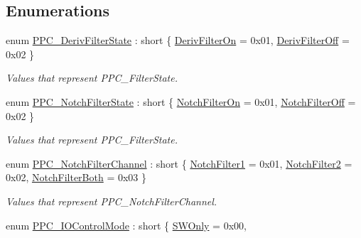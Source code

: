 \subsection*{Enumerations}
\begin{DoxyCompactItemize}
\item 
enum \hyperlink{group___benchtop_precision_piezo_ga59c677623dc0d8e960f123455ba8c864}{P\+P\+C\+\_\+\+Deriv\+Filter\+State} \+: short \{ \hyperlink{group___benchtop_precision_piezo_gga59c677623dc0d8e960f123455ba8c864ac42a693ab637e877321469b16739886a}{Deriv\+Filter\+On} = 0x01, 
\hyperlink{group___benchtop_precision_piezo_gga59c677623dc0d8e960f123455ba8c864af91f79528c0467fddbec264caeb9fc90}{Deriv\+Filter\+Off} = 0x02
 \}\begin{DoxyCompactList}\small\item\em Values that represent P\+P\+C\+\_\+\+Filter\+State. \end{DoxyCompactList}
\item 
enum \hyperlink{group___benchtop_precision_piezo_ga03b89881d4e9a76087bbe1d517dd62b0}{P\+P\+C\+\_\+\+Notch\+Filter\+State} \+: short \{ \hyperlink{group___benchtop_precision_piezo_gga03b89881d4e9a76087bbe1d517dd62b0a0f64dd1738970346fc664d1bb42889bd}{Notch\+Filter\+On} = 0x01, 
\hyperlink{group___benchtop_precision_piezo_gga03b89881d4e9a76087bbe1d517dd62b0a6b3649849f2c11dde1261e5ca98526fa}{Notch\+Filter\+Off} = 0x02
 \}\begin{DoxyCompactList}\small\item\em Values that represent P\+P\+C\+\_\+\+Filter\+State. \end{DoxyCompactList}
\item 
enum \hyperlink{group___benchtop_precision_piezo_ga5cf04a851dbce8255243635d6364a1a0}{P\+P\+C\+\_\+\+Notch\+Filter\+Channel} \+: short \{ \hyperlink{group___benchtop_precision_piezo_gga5cf04a851dbce8255243635d6364a1a0ac5f6a7757e1f86872713ae561005402f}{Notch\+Filter1} = 0x01, 
\hyperlink{group___benchtop_precision_piezo_gga5cf04a851dbce8255243635d6364a1a0a0d99e87c5b34c1b17f4b0e2153e8c5b3}{Notch\+Filter2} = 0x02, 
\hyperlink{group___benchtop_precision_piezo_gga5cf04a851dbce8255243635d6364a1a0a51ce4e1d6e0264fdc1f57447ebe16c10}{Notch\+Filter\+Both} = 0x03
 \}\begin{DoxyCompactList}\small\item\em Values that represent P\+P\+C\+\_\+\+Notch\+Filter\+Channel. \end{DoxyCompactList}
\item 
enum \hyperlink{group___benchtop_precision_piezo_gad49093cdbcb82112f991ef860e01c020}{P\+P\+C\+\_\+\+I\+O\+Control\+Mode} \+: short \{ \hyperlink{group___benchtop_precision_piezo_ggad49093cdbcb82112f991ef860e01c020a319a2e28e1498bdc6dcfa84ad645fbe4}{S\+W\+Only} = 0x00, 

\end{DoxyCompactItemize}
